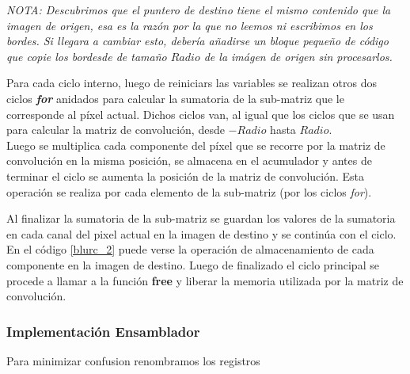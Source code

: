 \emph{NOTA: Descubrimos que el puntero de destino tiene el mismo contenido que la imagen de origen, esa es la raz\'on por la que no leemos ni escribimos en los bordes. Si llegara a cambiar esto, deber\'ia añadirse un bloque peque\~no de c\'odigo que copie los bordesde de tama\~no $Radio$ de la im\'agen de origen sin procesarlos.}

Para cada ciclo interno, luego de reiniciars las variables se realizan otros dos ciclos \textbf{\emph{for}} anidados para calcular la sumatoria de la sub-matriz que le corresponde al p\'ixel actual. Dichos ciclos van, al igual que los ciclos que se usan para calcular la matriz de convoluci\'on, desde $-Radio$ hasta $Radio$.\\
Luego se multiplica cada componente del p\'ixel que se recorre por la matriz de convoluci\'on en la misma posici\'on, se almacena en el acumulador y antes de terminar el ciclo se aumenta la posici\'on de la matriz de convoluci\'on. Esta operaci\'on se realiza por cada elemento de la sub-matriz (por los ciclos \emph{for}).

Al finalizar la sumatoria de la sub-matriz se guardan los valores de la sumatoria en cada canal del pixel actual en la imagen de destino y se contin\'ua con el ciclo. En el c\'odigo \ref{blurc_2} puede verse la operaci\'on de almacenamiento de cada componente en la imagen de destino.
Luego de finalizado el ciclo principal se procede a llamar a la funci\'on \textbf{free} y liberar la memoria utilizada por la matriz de convoluci\'on.


\subsubsection{Implementaci\'on Ensamblador}
\label{sec:blur_impasm}

Para minimizar confusion renombramos los registros \\

